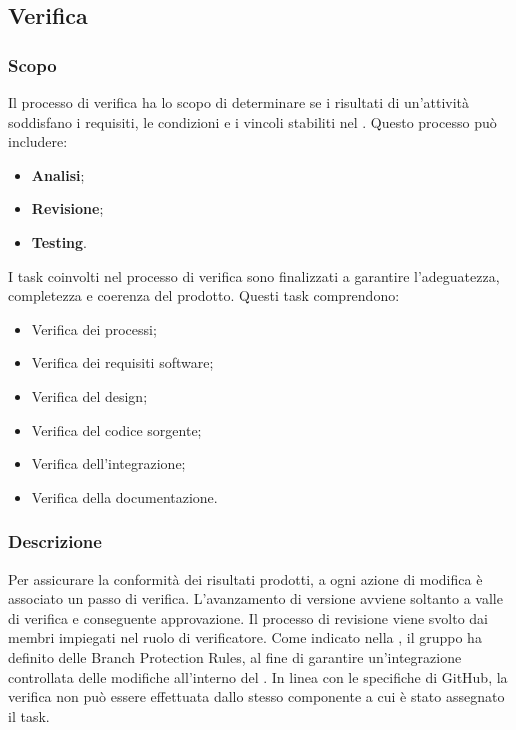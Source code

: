 \subsection{Verifica}\label{verifica}

\subsubsection{Scopo}
\par Il processo di verifica ha lo scopo di determinare se i risultati di un'attività soddisfano i requisiti, le condizioni e i vincoli stabiliti nel \PianoDiQualifica. Questo processo può includere:
\begin{itemize}
  \item \textbf{Analisi};
  \item \textbf{Revisione};
  \item \textbf{Testing}.
\end{itemize}

\vspace{0.5\baselineskip}
\par I task coinvolti nel processo di verifica sono finalizzati a garantire l'adeguatezza, completezza e coerenza del prodotto. Questi task comprendono:
\begin{itemize}
  \item Verifica dei processi;
  \item Verifica dei requisiti software;
  \item Verifica del design;
  \item Verifica del codice sorgente;
  \item Verifica dell'integrazione;
  \item Verifica della documentazione.
\end{itemize}

\subsubsection{Descrizione}
\par Per assicurare la conformità dei risultati prodotti, a ogni azione di modifica è associato un passo di verifica. L’avanzamento di versione avviene soltanto a valle di verifica e conseguente approvazione. Il processo di revisione viene svolto dai membri impiegati nel ruolo di verificatore. Come indicato nella , il gruppo ha definito delle Branch Protection Rules, al fine di garantire un'integrazione controllata delle modifiche all'interno del . In linea con le specifiche di GitHub, la verifica non può essere effettuata dallo stesso componente a cui è stato assegnato il task.


